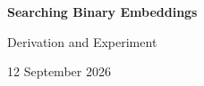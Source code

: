 \documentclass[11pt,a4paper]{article}
\begin{document}
{\Large\bfseries\color{Ink} Searching Binary Embeddings}\par
{\large Derivation and Experiment}\par
{\small 12 September 2026}\par





\end{document}
